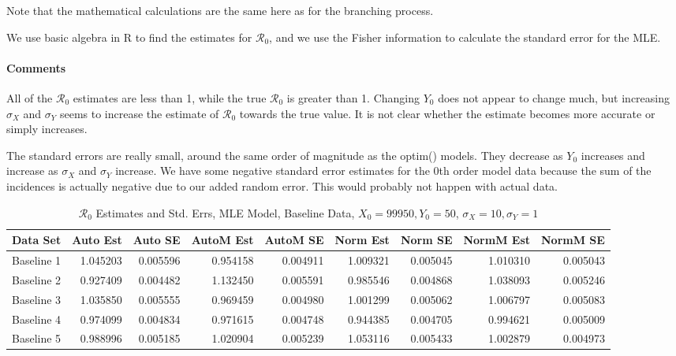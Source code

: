 \documentclass[12pt]{article}
\newcommand{\rr}{\ensuremath{\mathcal{R}_0}}
\begin{document}
Note that the mathematical calculations are the same here as for the branching process.

We use basic algebra in R to find the estimates for $\rr$, and we use the Fisher information to calculate the standard error for the MLE.

\paragraph{Comments}

All of the $\rr$ estimates are less than 1, while the true $\rr$ is greater than 1. Changing $Y_0$ does not appear to change much, but increasing $\sigma_X$ and $\sigma_Y$ seems to increase the estimate of $\rr$ towards the true value. It is not clear whether the estimate becomes more accurate or simply increases.

The standard errors are really small, around the same order of magnitude as the optim() models. They decrease as $Y_0$ increases and increase as $\sigma_X$ and $\sigma_Y$ increase. We have some negative standard error estimates for the 0th order model data because the sum of the incidences is actually negative due to our added random error. This would probably not happen with actual data.

\begin{table}[H]
	
	\caption{$\rr$ Estimates and Std. Errs, MLE Model, 
		Baseline Data, $X_0 = 99950, Y_0 = 50$, 
		$\sigma_X = 10, \sigma_Y = 1$}
	\begin{footnotesize}
		\hskip -1cm
		\begin{tabular}{l|r|r|r|r|r|r|r|r}
			\hline
			Data Set & Auto Est & Auto SE & AutoM Est & AutoM SE & Norm Est & Norm SE & NormM Est & NormM SE\\
			\hline
			Baseline 1 & 1.045203 & 0.005596 & 0.954158 & 0.004911 & 1.009321 & 0.005045 & 1.010310 & 0.005043\\
			\hline
			Baseline 2 & 0.927409 & 0.004482 & 1.132450 & 0.005591 & 0.985546 & 0.004868 & 1.038093 & 0.005246\\
			\hline
			Baseline 3 & 1.035850 & 0.005555 & 0.969459 & 0.004980 & 1.001299 & 0.005062 & 1.006797 & 0.005083\\
			\hline
			Baseline 4 & 0.974099 & 0.004834 & 0.971615 & 0.004748 & 0.944385 & 0.004705 & 0.994621 & 0.005009\\
			\hline
			Baseline 5 & 0.988996 & 0.005185 & 1.020904 & 0.005239 & 1.053116 & 0.005433 & 1.002879 & 0.004973\\
			\hline
		\end{tabular}
	\end{footnotesize}
\end{table}
\end{document}
